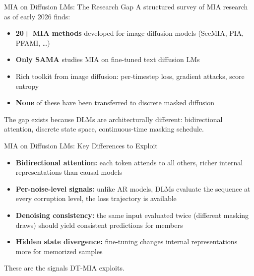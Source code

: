 \documentclass[10pt, aspectratio=169]{beamer}
\begin{document}

\begin{frame}{MIA on Diffusion LMs: The Research Gap}
  A structured survey of MIA research as of early 2026 finds:\\[8pt]
  \begin{itemize}
    \item \textbf{20+ MIA methods} developed for image diffusion models (SecMIA, PIA, PFAMI, \ldots)
    \item \textbf{Only SAMA} studies MIA on fine-tuned text diffusion LMs
    \item Rich toolkit from image diffusion: per-timestep loss, gradient attacks, score entropy
    \item \textbf{None} of these have been transferred to discrete masked diffusion
  \end{itemize}
  \vspace{8pt}
  The gap exists because DLMs are architecturally different: bidirectional attention, discrete state space,
  continuous-time masking schedule.
\end{frame}

\begin{frame}{MIA on Diffusion LMs: Key Differences to Exploit}
  \begin{itemize}
    \item \textbf{Bidirectional attention:} each token attends to all others, richer internal representations than causal models
    \item \textbf{Per-noise-level signals:} unlike AR models, DLMs evaluate the sequence at every corruption level, the loss trajectory is available
    \item \textbf{Denoising consistency:} the same input evaluated twice (different masking draws) should yield consistent predictions for members
    \item \textbf{Hidden state divergence:} fine-tuning changes internal representations more for memorized samples
  \end{itemize}
  \vspace{8pt}
  These are the signals DT-MIA exploits.
\end{frame}
\end{document}
